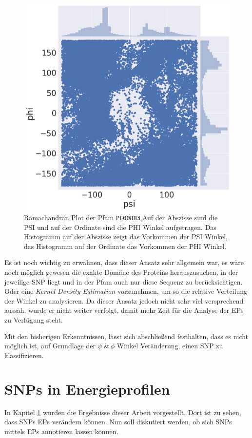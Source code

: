 \begin{figure}
    \centering
    \includegraphics[width=.90\textwidth]{images/ramachandranplot_PF00883.png}
    \caption{Ramachandran Plot der Pfam \texttt{PF00883},Auf der Abszisse sind die PSI und auf der Ordinate sind die PHI Winkel aufgetragen. Das Histogramm auf der Abszisse zeigt das Vorkommen der PSI Winkel, das Histogramm auf der Ordinate das Vorkommen der PHI Winkel.}
    \label{fig:ramachandran_PF00883}
\end{figure}

Es ist noch wichtig zu erwähnen, dass dieser Ansatz sehr allgemein war, es wäre noch möglich gewesen die exakte Domäne des Proteins herauszusuchen, in der jeweilige \ac{SNP} liegt und in der \ac{Pfam} auch nur diese Sequenz zu berücksichtigen. Oder eine \emph{Kernel Density Estimation} \cite{Parzen.1962} vorzunehmen, um so die relative Verteilung der Winkel zu analysieren. Da dieser Ansatz jedoch nicht sehr viel versprechend aussah, wurde er nicht weiter verfolgt, damit mehr Zeit für die Analyse der \ac{EP}s zu Verfügung steht.

Mit den bisherigen Erkenntnissen, lässt sich abschließend festhalten, dass es nicht möglich ist, auf Grundlage der $\psi\ \&\ \phi$ Winkel Veränderung, einen \ac{SNP} zu klassifizieren.


\section{SNPs in Energieprofilen}
\label{sec:snps_in_eps}
In Kapitel \ref{sec:snps_in_eps} wurden die Ergebnisse dieser Arbeit vorgestellt. Dort ist zu sehen, dass \ac{SNP}s \ac{EP}s verändern können. Nun soll diskutiert werden, ob sich \ac{SNP}s mittels \ac{EP}s annotieren lassen können.


